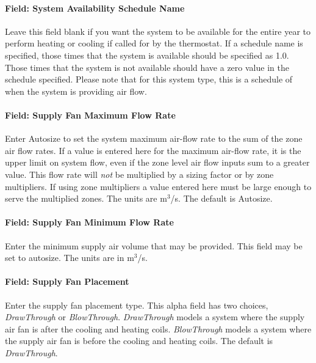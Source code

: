 \paragraph{Field: System Availability Schedule Name}\label{field-system-availability-schedule-name-11}

Leave this field blank if you want the system to be available for the entire year to perform heating or cooling if called for by the thermostat. If a schedule name is specified, those times that the system is available should be specified as 1.0. Those times that the system is not available should have a zero value in the schedule specified. Please note that for this system type, this is a schedule of when the system is providing air flow.

\paragraph{Field: Supply Fan Maximum Flow Rate}\label{field-supply-fan-maximum-flow-rate-2}

Enter Autosize to set the system maximum air-flow rate to the sum of the zone air flow rates. If a value is entered here for the maximum air-flow rate, it is the upper limit on system flow, even if the zone level air flow inputs sum to a greater value. This flow rate will \emph{not} be multiplied by a sizing factor or by zone multipliers. If using zone multipliers a value entered here must be large enough to serve the multiplied zones. The units are m\(^{3}\)/s. The default is Autosize.

\paragraph{Field: Supply Fan Minimum Flow Rate}\label{field-supply-fan-minimum-flow-rate-1}

Enter the minimum supply air volume that may be provided. This field may be set to autosize. The units are in m\(^{3}\)/s.

\paragraph{Field: Supply Fan Placement}\label{field-supply-fan-placement-8}

Enter the supply fan placement type. This alpha field has two choices, \emph{DrawThrough} or \emph{BlowThrough}. \emph{DrawThrough} models a system where the supply air fan is after the cooling and heating coils. \emph{BlowThrough} models a system where the supply air fan is before the cooling and heating coils. The default is \emph{DrawThrough}.

